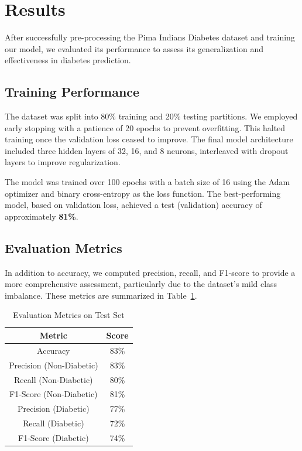 \section{Results}
\label{sec:results}

After successfully pre-processing the Pima Indians Diabetes dataset and training our model, we evaluated its performance to assess its generalization and effectiveness in diabetes prediction.

\subsection*{Training Performance}

The dataset was split into 80\% training and 20\% testing partitions. We employed early stopping with a patience of 20 epochs to prevent overfitting. This halted training once the validation loss ceased to improve. The final model architecture included three hidden layers of 32, 16, and 8 neurons, interleaved with dropout layers to improve regularization.

The model was trained over 100 epochs with a batch size of 16 using the Adam optimizer and binary cross-entropy as the loss function. The best-performing model, based on validation loss, achieved a test (validation) accuracy of approximately \textbf{81\%}.

\subsection*{Evaluation Metrics}
In addition to accuracy, we computed precision, recall, and F1-score to provide a more comprehensive assessment, particularly due to the dataset’s mild class imbalance. These metrics are summarized in Table~\ref{tab:metrics}.

\begin{table}[h]
\centering
\caption{Evaluation Metrics on Test Set}
\label{tab:metrics}
\begin{tabular}{|c|c|}
\hline
\textbf{Metric} & \textbf{Score} \\
\hline
Accuracy & 83\% \\
Precision (Non-Diabetic) & 83\% \\
Recall (Non-Diabetic) & 80\% \\
F1-Score (Non-Diabetic) & 81\% \\
\hline
Precision (Diabetic) & 77\% \\
Recall (Diabetic) & 72\% \\
F1-Score (Diabetic) & 74\% \\
\hline
\end{tabular}
\end{table}

